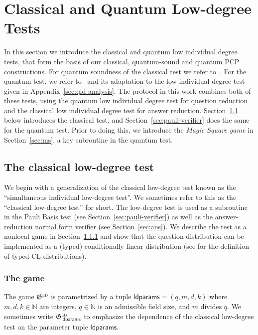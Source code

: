 \documentclass[11pt]{article}
\theoremstyle{definition}
\newcommand{\N}{\ensuremath{\mathbb{N}}}
\newcommand{\ld}{\textsc{ld}}
\newcommand{\game}{\mathfrak{G}}
\newcommand{\ldc}{k}
\newcommand{\ldparams}{\mathsf{ldparams}}
\begin{document}
 
\section{Classical and Quantum Low-degree Tests}
\label{sec:ldt}

In this section we introduce the classical and quantum low individual degree tests, that form the basis of our classical, quantum-sound and quantum PCP constructions. For quantum soundness of the classical test we refer to~\cite{ML20}. For the quantum test, we refer to~\cite{natarajan2018low} and its adaptation to the low individual degree test given in Appendix~\ref{sec:qld-analysis}. 
The protocol in this work combines both of these tests, using the quantum
low individual degree test for question reduction and the classical low individual degree test for
answer reduction.
Section~\ref{sec:ld-verifier} below introduces the classical test,
and Section~\ref{sec:pauli-verifier} does the same for the quantum 
test.
Prior to doing this, we introduce the \emph{Magic Square game} in
Section~\ref{sec:ms}, a key subroutine in the quantum test.


\subsection{The classical low-degree test}
\label{sec:ld-verifier}

We begin with a generalization of the classical low-degree test known as the
``simultaneous individual low-degree test''.
We sometimes refer to this as the ``classical low-degree test'' for short.
The low-degree test is used as a subroutine in the Pauli Basis test (see
Section~\ref{sec:pauli-verifier}) as well as the answer-reduction normal form
verifier (see Section~\ref{sec:ans}).
We describe the test as a nonlocal game in Section~\ref{sec:ld-game} and show
that the question distribution can be implemented as a (typed) conditionally
linear distribution (see  for the definition of typed CL
distributions).


\subsubsection{The game}
\label{sec:ld-game}

The game $\game^\ld$ is parametrized by a tuple $\ldparams = (q, m, d, \ldc)$
where $m, d, \ldc \in \N$ are integers, $q \in \N$ is an admissible field size,
and $m$ divides $q$.
We sometimes write $\game^\ld_\ldparams$ to emphasize the dependence of the
classical low-degree test on the parameter tuple $\ldparams$.
\end{document}
